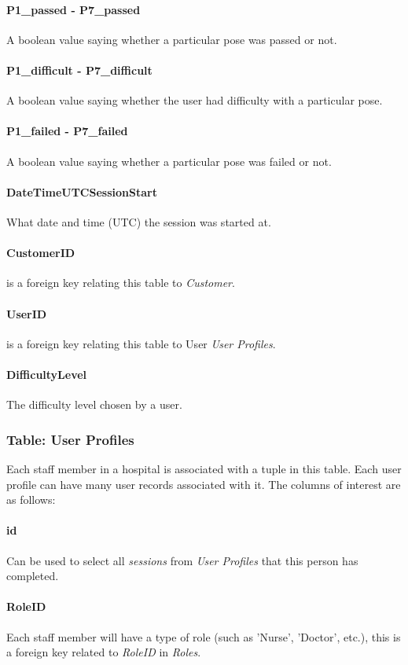             \paragraph{P1\_passed - P7\_passed} A boolean value saying whether a particular pose was passed or not.
            \paragraph{P1\_difficult - P7\_difficult} A boolean value saying whether the user had difficulty with a particular pose.
            \paragraph{P1\_failed - P7\_failed} A boolean value saying whether a particular pose was failed or not.
            \paragraph{DateTimeUTCSessionStart} What date and time (UTC) the session was started at.
            \paragraph{CustomerID} is a foreign key relating this table to {\slshape Customer}.
            \paragraph{UserID} is a foreign key relating this table to User {\slshape User Profiles}.
            \paragraph{DifficultyLevel} The difficulty level chosen by a user.
        \subsubsection{Table: User Profiles} Each staff member in a hospital is associated with a tuple in this table. Each user profile can have many user records associated with it. The columns of interest are as follows:
            \paragraph{id} Can be used to select all {\slshape sessions} from {\slshape User Profiles} that this person has completed.
            \paragraph{RoleID} Each staff member will have a type of role (such as 'Nurse', 'Doctor', etc.), this is a foreign key related to {\slshape RoleID} in {\slshape Roles}.
